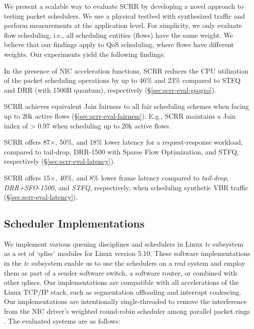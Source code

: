 We present a scalable way to evaluate SCRR by developing a novel approach to testing packet schedulers. We use a physical testbed with synthesized traffic and perform measurements at the application level. For simplicity, we only evaluate flow scheduling, i.e., all scheduling entities (flows) have the same weight. We believe that our findings apply to QoS scheduling, where flows have different weights.
Our experiments yield the following findings:
\begin{compactitem}
    \item In the presence of NIC acceleration functions, SCRR reduces the CPU utilization of the packet scheduling operations by up to 46\% and 23\% compared to STFQ and DRR (with 1500B quantum), respectively (\S\ref{sec:scrr-eval-gsogro}).
    \item SCRR achieves equivalent Jain fairness to all fair scheduling schemes when facing up to 20k active flows (\S\ref{sec:scrr-eval-fairness}). E.g., SCRR maintains a Jain index of > 0.97 when scheduling up to 20k active flows.
    \item SCRR offers 87$\times$, 50\%, and 18\% lower latency for a request-response workload, compared to tail-drop, DRR-1500 with Sparse Flow Optimization, and STFQ, respectively (\S\ref{sec:scrr-eval-latency}).
    \item SCRR offers 15$\times$, 40\%, and 8\% lower frame latency compared to \textit{tail-drop}, \textit{DRR+SFO-1500}, and \textit{STFQ}, respectively, when scheduling synthetic VBR traffic (\S\ref{sec:scrr-eval-latency}).
\end{compactitem}




\subsection{Scheduler Implementations}
\label{sub:modules}

We implement various queuing disciplines and schedulers in Linux \textit{tc} subsystem as a set of `qdisc' modules for Linux version 5.10. These software implementations in the \textit{tc} subsystem enable us to use the schedulers on a real system and employ them as part of a sender software switch, a software router, or combined with other qdiscs. Our implementations are compatible with all accelerations of the Linux
TCP/IP stack, such as segmentation offloading and interrupt
coalescing. Our implementations are intentionally single-threaded to remove the interference from the NIC driver's weighted round-robin scheduler among parallel packet rings \cite{intel710,titan}. The evaluated systems are as follows:

